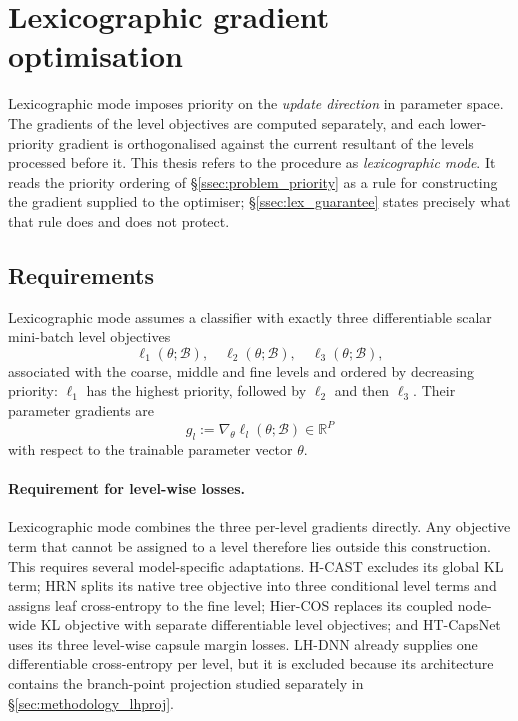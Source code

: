 \section{Lexicographic gradient optimisation}
\label{sec:methodology_lex}

Lexicographic mode imposes priority on the \emph{update direction} in parameter
space. The gradients of the level objectives are computed separately,
and each lower-priority gradient is orthogonalised against the current resultant
of the levels processed before it. This thesis refers to the procedure as
\emph{lexicographic mode}. It reads the priority ordering of
\S\ref{ssec:problem_priority} as a rule for constructing the gradient supplied to
the optimiser; \S\ref{ssec:lex_guarantee} states precisely what that rule does
and does not protect.

\subsection{Requirements}
\label{ssec:lex_setting}

Lexicographic mode assumes a classifier with exactly three differentiable scalar
mini-batch level objectives
\[
\ell_1(\theta;\mathcal{B}),\quad
\ell_2(\theta;\mathcal{B}),\quad
\ell_3(\theta;\mathcal{B}),
\]
associated with the coarse, middle and fine levels and ordered by decreasing
priority: $\ell_1$ has the highest priority, followed by $\ell_2$ and then
$\ell_3$. Their parameter gradients are
\[
g_l := \nabla_\theta \ell_l(\theta;\mathcal{B}) \in \mathbb{R}^{P}
\]
with respect to the trainable parameter vector $\theta$.

\paragraph{Requirement for level-wise losses.} Lexicographic mode combines the three per-level
gradients directly. Any objective term that cannot be assigned to a level
therefore lies outside this construction. This requires several model-specific
adaptations. H-CAST excludes its global KL term; HRN splits its native tree
objective into three conditional level terms and assigns leaf cross-entropy to
the fine level;
Hier-COS replaces its coupled node-wide KL objective with separate differentiable
level objectives; and HT-CapsNet uses its three level-wise capsule margin losses.
LH-DNN already supplies one differentiable cross-entropy per level, but it is
excluded because its architecture contains the branch-point projection studied
separately in \S\ref{sec:methodology_lhproj}.

